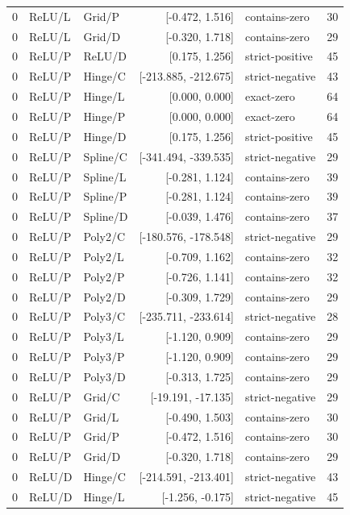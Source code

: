 \begin{longtable}{lllrlr}
0 & ReLU/L & Grid/P & [-0.472, 1.516] & contains-zero & 30 \\
0 & ReLU/L & Grid/D & [-0.320, 1.718] & contains-zero & 29 \\
0 & ReLU/P & ReLU/D & [0.175, 1.256] & strict-positive & 45 \\
0 & ReLU/P & Hinge/C & [-213.885, -212.675] & strict-negative & 43 \\
0 & ReLU/P & Hinge/L & [0.000, 0.000] & exact-zero & 64 \\
0 & ReLU/P & Hinge/P & [0.000, 0.000] & exact-zero & 64 \\
0 & ReLU/P & Hinge/D & [0.175, 1.256] & strict-positive & 45 \\
0 & ReLU/P & Spline/C & [-341.494, -339.535] & strict-negative & 29 \\
0 & ReLU/P & Spline/L & [-0.281, 1.124] & contains-zero & 39 \\
0 & ReLU/P & Spline/P & [-0.281, 1.124] & contains-zero & 39 \\
0 & ReLU/P & Spline/D & [-0.039, 1.476] & contains-zero & 37 \\
0 & ReLU/P & Poly2/C & [-180.576, -178.548] & strict-negative & 29 \\
0 & ReLU/P & Poly2/L & [-0.709, 1.162] & contains-zero & 32 \\
0 & ReLU/P & Poly2/P & [-0.726, 1.141] & contains-zero & 32 \\
0 & ReLU/P & Poly2/D & [-0.309, 1.729] & contains-zero & 29 \\
0 & ReLU/P & Poly3/C & [-235.711, -233.614] & strict-negative & 28 \\
0 & ReLU/P & Poly3/L & [-1.120, 0.909] & contains-zero & 29 \\
0 & ReLU/P & Poly3/P & [-1.120, 0.909] & contains-zero & 29 \\
0 & ReLU/P & Poly3/D & [-0.313, 1.725] & contains-zero & 29 \\
0 & ReLU/P & Grid/C & [-19.191, -17.135] & strict-negative & 29 \\
0 & ReLU/P & Grid/L & [-0.490, 1.503] & contains-zero & 30 \\
0 & ReLU/P & Grid/P & [-0.472, 1.516] & contains-zero & 30 \\
0 & ReLU/P & Grid/D & [-0.320, 1.718] & contains-zero & 29 \\
0 & ReLU/D & Hinge/C & [-214.591, -213.401] & strict-negative & 43 \\
0 & ReLU/D & Hinge/L & [-1.256, -0.175] & strict-negative & 45 \\

\end{longtable}
